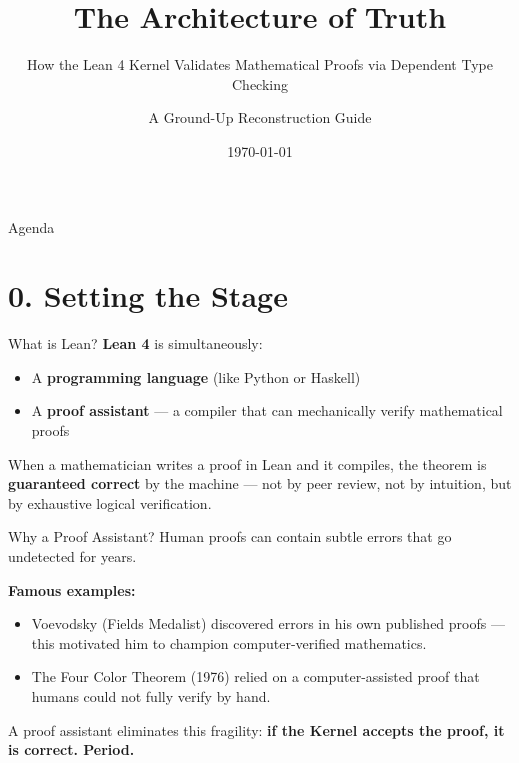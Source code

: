 \documentclass[10pt,aspectratio=169]{beamer}
\title{The Architecture of Truth}
\subtitle{How the Lean 4 Kernel Validates Mathematical Proofs via Dependent Type Checking}
\date{\today}
\author{A Ground-Up Reconstruction Guide}
\institute{SLP: Prof. Sudarshan Vijay}
\begin{document}
\maketitle

\begin{frame}{Agenda}
    \tableofcontents
\end{frame}

\section{0. Setting the Stage}

\begin{frame}[fragile]{What is Lean?}
    \textbf{Lean 4} is simultaneously:
    \begin{itemize}
        \item A \textbf{programming language} (like Python or Haskell)
        \item A \textbf{proof assistant} — a compiler that can mechanically verify mathematical proofs
    \end{itemize}
    
    \vspace{1em}
    When a mathematician writes a proof in Lean and it compiles, the theorem is \textbf{guaranteed correct} by the machine — not by peer review, not by intuition, but by exhaustive logical verification.
\end{frame}

\begin{frame}[fragile]{Why a Proof Assistant?}
    Human proofs can contain subtle errors that go undetected for years.
    
    \vspace{1em}
    \textbf{Famous examples:}
    \begin{itemize}
        \item Voevodsky (Fields Medalist) discovered errors in his own published proofs — this motivated him to champion computer-verified mathematics.
        \item The Four Color Theorem (1976) relied on a computer-assisted proof that humans could not fully verify by hand.
    \end{itemize}
    
    \vspace{1em}
    A proof assistant eliminates this fragility: \textbf{if the Kernel accepts the proof, it is correct. Period.}
\end{frame}
\end{document}
